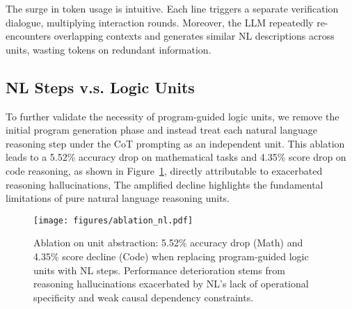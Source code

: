 The surge in token usage is intuitive. Each line triggers a separate verification dialogue, multiplying interaction rounds. Moreover, the LLM repeatedly re-encounters overlapping contexts and generates similar NL descriptions across units, wasting tokens on redundant information.


\subsection{NL Steps v.s. Logic Units}
To further validate the necessity of program-guided logic units, we remove the initial program generation phase and instead treat each natural language reasoning step under the CoT prompting as an independent unit.
This ablation leads to a 5.52\% accuracy drop on mathematical tasks and 4.35\% score drop on code reasoning, as shown in Figure~\ref{fig:abla:nl}, directly attributable to exacerbated reasoning hallucinations, 
The amplified decline highlights the fundamental limitations of pure natural language reasoning units.

\begin{figure}[htb]
    \centering
    \vspace{-0.1in}
        {\texttt{[image: figures/ablation\_nl.pdf]}}
        \vspace{-0.1in}
    \caption{Ablation on unit abstraction: 5.52\% accuracy drop (Math) and 4.35\% score decline (Code) when replacing program-guided logic units with NL steps. Performance deterioration stems from reasoning hallucinations exacerbated by NL's lack of operational specificity and weak causal dependency constraints.}
    \vspace{-0.1in}
    \label{fig:abla:nl}
\end{figure}

